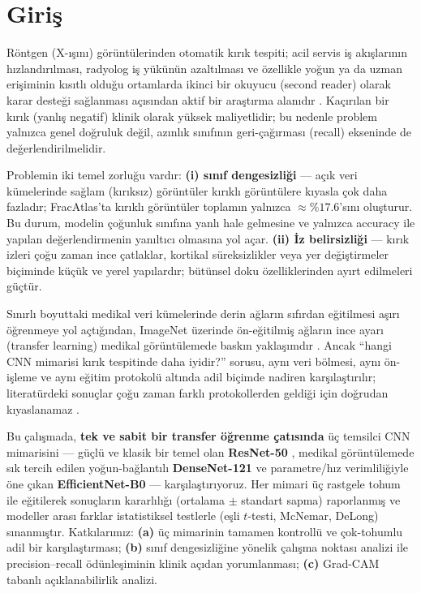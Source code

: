 \documentclass[conference]{IEEEtran}
\begin{document}
\section{Giriş}
Röntgen (X-ışını) görüntülerinden otomatik kırık tespiti; acil servis iş akışlarının hızlandırılması, radyolog iş yükünün azaltılması ve özellikle yoğun ya da uzman erişiminin kısıtlı olduğu ortamlarda ikinci bir okuyucu (second reader) olarak karar desteği sağlanması açısından aktif bir araştırma alanıdır \cite{fracatlas,lindsey,kim}. Kaçırılan bir kırık (yanlış negatif) klinik olarak yüksek maliyetlidir; bu nedenle problem yalnızca genel doğruluk değil, azınlık sınıfının geri-çağırması (recall) ekseninde de değerlendirilmelidir.

Problemin iki temel zorluğu vardır: \textbf{(i) sınıf dengesizliği} --- açık veri kümelerinde sağlam (kırıksız) görüntüler kırıklı görüntülere kıyasla çok daha fazladır; FracAtlas'ta kırıklı görüntüler toplamın yalnızca $\approx \%17.6$'sını oluşturur. Bu durum, modelin çoğunluk sınıfına yanlı hale gelmesine ve yalnızca accuracy ile yapılan değerlendirmenin yanıltıcı olmasına yol açar. \textbf{(ii) İz belirsizliği} --- kırık izleri çoğu zaman ince çatlaklar, kortikal süreksizlikler veya yer değiştirmeler biçiminde küçük ve yerel yapılardır; bütünsel doku özelliklerinden ayırt edilmeleri güçtür.

Sınırlı boyuttaki medikal veri kümelerinde derin ağların sıfırdan eğitilmesi aşırı öğrenmeye yol açtığından, ImageNet üzerinde ön-eğitilmiş ağların ince ayarı (transfer learning) medikal görüntülemede baskın yaklaşımdır \cite{tajbakhsh,litjens}. Ancak ``hangi CNN mimarisi kırık tespitinde daha iyidir?'' sorusu, aynı veri bölmesi, aynı ön-işleme ve aynı eğitim protokolü altında adil biçimde nadiren karşılaştırılır; literatürdeki sonuçlar çoğu zaman farklı protokollerden geldiği için doğrudan kıyaslanamaz \cite{paplham}.

Bu çalışmada, \textbf{tek ve sabit bir transfer öğrenme çatısında} üç temsilci CNN mimarisini --- güçlü ve klasik bir temel olan \textbf{ResNet-50} \cite{resnet}, medikal görüntülemede sık tercih edilen yoğun-bağlantılı \textbf{DenseNet-121} \cite{densenet} ve parametre/hız verimliliğiyle öne çıkan \textbf{EfficientNet-B0} \cite{efficientnet} --- karşılaştırıyoruz. Her mimari üç rastgele tohum ile eğitilerek sonuçların kararlılığı (ortalama $\pm$ standart sapma) raporlanmış ve modeller arası farklar istatistiksel testlerle (eşli $t$-testi, McNemar, DeLong) sınanmıştır. Katkılarımız: \textbf{(a)} üç mimarinin tamamen kontrollü ve çok-tohumlu adil bir karşılaştırması; \textbf{(b)} sınıf dengesizliğine yönelik çalışma noktası analizi ile precision--recall ödünleşiminin klinik açıdan yorumlanması; \textbf{(c)} Grad-CAM tabanlı açıklanabilirlik analizi.
\end{document}
